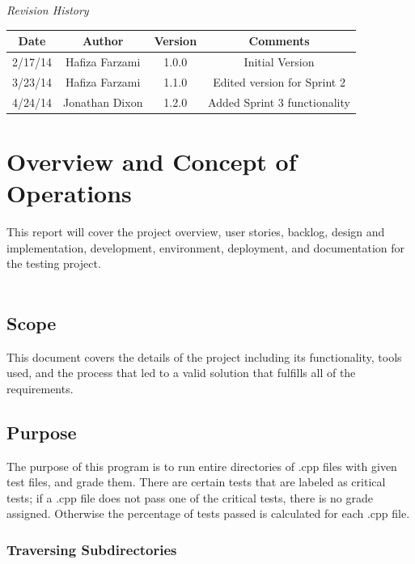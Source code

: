 \documentclass {article}
\begin{document}
		\vfill
		\textit{\color{blue}Revision History}\\
		\begin{tabular}{|c|c|c|c|}
		\hline 
		\textbf{Date} & \textbf{Author} & \textbf{Version} & \textbf{Comments} \\ 
		\hline 
		2/17/14 & Hafiza Farzami & 1.0.0 & Initial Version \\ 
		\hline 
		3/23/14 & Hafiza Farzami & 1.1.0 & Edited version for Sprint 2 \\ 
		\hline 
		4/24/14 & Jonathan Dixon & 1.2.0 & Added Sprint 3 functionality \\ 
		\hline 
		\end{tabular} 
		
	\newpage
	

		
	\section{\LARGE{\color{blue}Overview and Concept of Operations}}
	
		This report will cover the project overview, user stories, backlog,
		 design and implementation, development, environment, deployment, and 
		 documentation for the testing project.\\\\
		 
		 \subsection{\Large{\color{blue}Scope}}
		 	This document covers the details of the project including its
		 	 functionality, tools used, and the process that led to a
		 	 valid solution that fulfills all of the requirements.
		 	 
		 \subsection{\Large{\color{blue}Purpose}}
		 	The purpose of this program is to run entire directories of
		 	 .cpp files with given test files, and grade them. There are
		 	 certain tests that are labeled as critical tests; if a .cpp
		 	 file does not pass one of the critical tests, there is no grade
		 	 assigned. Otherwise the percentage of tests passed is
		 	 calculated for each .cpp file.
		 	 
		 	\subsubsection{\large{\color{cyan}Traversing Subdirectories}}
\end{document}
